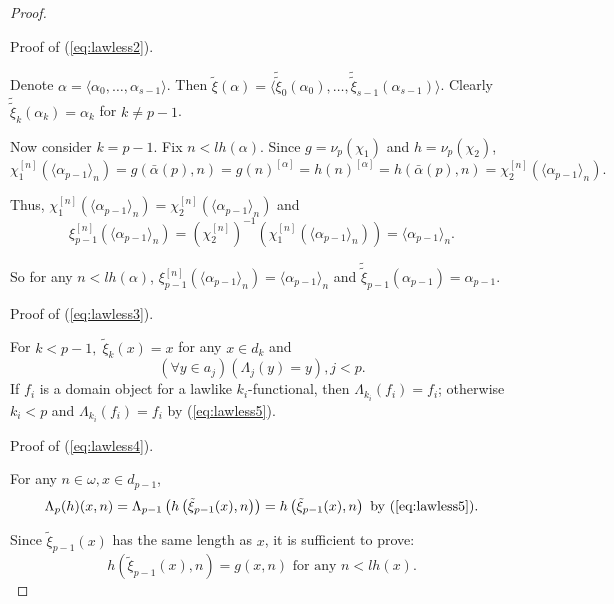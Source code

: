 \documentclass{asl}
\theoremstyle{definition}
\begin{document}
\begin{proof}
\begin{center}
Proof of (\ref{eq:lawless2}). 
\end{center}

Denote $\alpha=\langle\alpha_0,\ldots,\alpha_{s-1}\rangle $. Then $ \tilde{\xi} (\alpha)= \langle \tilde{\tilde{\xi}}_0(\alpha_0),\ldots,\tilde{\tilde{\xi}}_{s-1}(\alpha_{s-1}) \rangle$.
Clearly $\tilde{\tilde{\xi}}_k(\alpha_k)=\alpha_k$ for $ k\neq p-1 $.

Now consider $ k=p-1 $. Fix $ n<lh(\alpha) $. Since $ g=\nu_p(\chi_1) $ and $ h=\nu_p(\chi_2) $, 
\[ \chi_1^{[n]}\left( \langle \alpha_{p-1}\rangle_n \right) = g(\bar{\alpha}(p),n) =g(n)^{[\alpha]}= h(n)^{[\alpha]}=h(\bar{\alpha}(p),n)=\chi_2^{[n]}\left( \langle \alpha_{p-1}\rangle_n \right). \]

Thus, $ \chi_1^{[n]}\left( \langle \alpha_{p-1}\rangle_n \right) =\chi_2^{[n]}\left( \langle \alpha_{p-1}\rangle_n \right) $ and 
\[ \xi_{p-1}^{[n]}\left(\langle \alpha_{p-1} \rangle_n \right) = \left( \chi_2^{[n]}\right) ^{-1}
\left(  \chi_1^{[n]}\left( \langle \alpha_{p-1}\rangle_n \right) \right) =
\langle \alpha_{p-1} \rangle_n. \]

So for any $ n<lh(\alpha) $, $ \xi_{p-1}^{[n]}\left(\langle \alpha_{p-1} \rangle_n \right) = \langle \alpha_{p-1} \rangle_n$ and $\tilde{\tilde{\xi}}_{p-1}(\alpha_{p-1})=\alpha_{p-1} $.

\begin{center}
Proof of (\ref{eq:lawless3}). 
\end{center}

For $k<p-1,\; \tilde{\xi}_k(x)=x $ for any $ x\in d_k$ and 
\begin{equation}
(\forall y \in a_{j})\left( \Lambda_j(y)=y\right), j<p. \label{eq:lawless5}
\end{equation}
If $ f_i $ is a domain object for a lawlike $ k_i $-functional, then $\Lambda_{k_i}(f_i)=f_i  $; otherwise $ k_i<p $ and $\Lambda_{k_i}(f_i)=f_i  $ by (\ref{eq:lawless5}).

\begin{center}
Proof of (\ref{eq:lawless4}). 
\end{center}

For any $ n\in\omega,x\in d_{p-1}$,
\[ \Lambda_p(h)(x,n)=\Lambda_{p-1}\left(h\left(\tilde{\xi}_{p-1}(x),n \right) \right)= h\left( \tilde{\xi}_{p-1}(x),n \right) \text{ by } (\ref{eq:lawless5}).\]

Since $ \tilde{\xi}_{p-1}(x) $ has the same length as $ x $, it is sufficient to prove:
\[h\left( \tilde{\xi}_{p-1}(x),n \right)=g(x,n) \text{ for any }n<lh(x) .\]


\end{proof}
\end{document}
